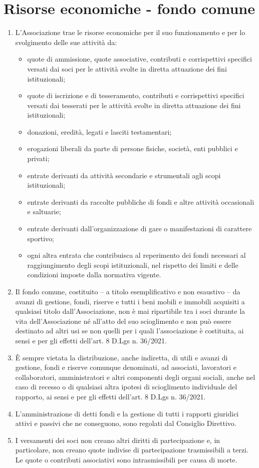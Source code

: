 \documentclass{djtsdoc}
\begin{document}
	\section{Risorse economiche - fondo comune}
	\begin{enumerate}
		\item L'Associazione trae le risorse economiche per il suo funzionamento e per lo svolgimento delle sue attività da:
		\begin{itemize}
			\item quote di ammissione, quote associative, contributi e corrispettivi specifici versati dai soci per le attività svolte in diretta attuazione dei fini istituzionali;
			\item quote di iscrizione e di tesseramento, contributi e corrispettivi specifici versati dai tesserati per le attività svolte in diretta attuazione dei fini istituzionali;
			\item donazioni, eredità, legati e lasciti testamentari;
			\item erogazioni liberali da parte di persone fisiche, società, enti pubblici e privati;
			\item entrate derivanti da attività secondarie e strumentali agli scopi istituzionali;
			\item entrate derivanti da raccolte pubbliche di fondi e altre attività occasionali e saltuarie;
			\item entrate derivanti dall'organizzazione di gare o manifestazioni di carattere sportivo;
			\item ogni altra entrata che contribuisca al reperimento dei fondi necessari al raggiungimento degli scopi istituzionali, nel rispetto dei limiti e delle condizioni imposte dalla normativa vigente.
		\end{itemize}
		\item Il fondo comune, costituito – a titolo esemplificativo e non esaustivo – da avanzi di gestione, fondi, riserve e tutti i beni mobili e immobili  acquisiti a qualsiasi titolo dall'Associazione, non è mai ripartibile tra i soci durante la vita dell'Associazione né all'atto del suo scioglimento e non può essere destinato ad altri usi se non quelli per i quali l'associazione è costituita, ai sensi e per gli effetti dell'art. 8 D.Lgs n. 36/2021.
		\item È sempre vietata la distribuzione, anche indiretta, di utili e avanzi di gestione, fondi e riserve comunque denominati, ad associati, lavoratori e collaboratori, amministratori e altri componenti degli organi sociali, anche nel caso di recesso o di qualsiasi altra ipotesi di scioglimento individuale del rapporto, ai sensi e per gli effetti dell'art. 8 D.Lgs n. 36/2021.
		\item L'amministrazione di detti fondi e la gestione di tutti i rapporti giuridici attivi e passivi che ne conseguono, sono regolati dal Consiglio Direttivo.
		\item I versamenti dei soci non creano altri diritti di partecipazione e, in particolare, non creano quote indivise di partecipazione trasmissibili a terzi. Le quote o contributi associativi sono intrasmissibili per causa di morte.
	\end{enumerate}
	
\end{document}
